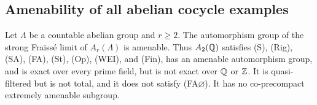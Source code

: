 \subsection{Amenability of all abelian cocycle examples}

\begin{theorem}
\label{A:cocycle-amenability}
Let $\Lambda$ be a countable abelian group and $r\geq2$.
The automorphism group of the strong Fra\"iss\'e limit of
$A_r(\Lambda)$ is amenable. Thus $A_2(\mathbb Q)$ satisfies
(S), (Rig), (SA), (FA), (St), (Op), (WEI), and (Fin), has an
amenable automorphism group, and is exact over every prime
field, but is not exact over $\mathbb Q$ or $\mathbb Z$. It is
quasi-filtered but is not total, and it does not satisfy
(FA$\varnothing$). It has no co-precompact extremely amenable
subgroup.
\end{theorem}
